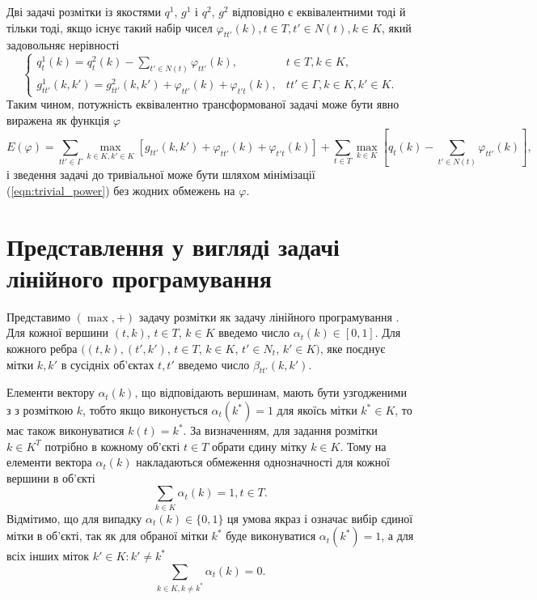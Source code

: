 Дві задачі розмітки із якостями $q^1$, $g^1$ і $q^2$, $g^2$ відповідно
є еквівалентними тоді й тільки тоді, якщо існує такий набір чисел 
$\varphi_{tt'}(k), t\in T, t'\in N(t), k\in K$, який задовольняє нерівності
\begin{equation}
    \begin{cases}
      q^1_t(k) = q^2_t(k) - \sum\limits_{t'\in N(t)} \varphi_{tt'}(k), & t\in T, k\in K,\\
      g^1_{tt'}(k,k') = g^2_{tt'}(k,k') + \varphi_{tt'}(k) + \varphi_{t't}(k), & 
        tt'\in\Gamma, k\in K, k'\in K.
    \end{cases}
  \end{equation}
Таким чином, потужність еквівалентно трансформованої задачі може бути 
явно виражена як функція $\varphi$
\begin{equation}
    \label{eqn:trivial_power}
    E(\varphi) = \sum\limits_{tt'\in\Gamma}\max\limits_{k\in K, k'\in K}[ g_{tt'}(k,k')
    + \varphi_{tt'}(k) + \varphi_{t't}(k)] + 
    \sum\limits_{t\in T}\max\limits_{k\in K}[ q_t(k) - \sum\limits_{t'\in N(t)} \varphi_{tt'}(k)],
   \end{equation}
і зведення задачі до тривіальної може бути шляхом мінімізації (\ref{eqn:trivial_power})
без жодних обмежень на $\varphi$.

\section{Представлення у вигляді задачі лінійного програмування}

Представимо $(\max,+)$ задачу розмітки як задачу 
лінійного програмування \cite{Werner:2010, savchynskyy}. Для кожної
вершини $(t,k)$, $t\in T$, $k\in K$ введемо число $\alpha_t(k)\in [0,1]$.
Для кожного ребра $((t,k),(t',k')$, $t\in T$, $k\in K$, $t'\in N_t$, $k'\in K)$, яке поєднує мітки
$k,k'$ в сусідніх об'єктах $t,t'$ введемо число $\beta_{tt'}(k,k')$. 

Елементи вектору $\alpha_t(k)$, що відповідають вершинам, мають бути узгодженими з 
з розміткою $k$, тобто якщо виконується $\alpha_t(k^*)=1$ для якоїсь мітки
$k^*\in K$, то має також виконуватися $k(t)=k^*$. За визначенням, для задання розмітки
$k\in K^T$ потрібно в кожному об'єкті $t\in T$ обрати єдину мітку $k\in K$.
Тому на елементи вектора $\alpha_t(k)$ накладаються обмеження однозначності для
кожної вершини в об'єкті
\begin{equation}
   \sum\limits_{k \in K} \alpha_t(k)=1,  t\in T.
 \end{equation}
Відмітимо, що для випадку $\alpha_t(k)\in \{0,1\}$ ця умова якраз і означає
вибір єдиної мітки в об'єкті, так як для обраної мітки $k^*$ буде виконуватися
$\alpha_t(k^*)=1$, а для всіх інших міток $k'\in K:k'\neq k^*$ 
\begin{equation}
  \sum\limits_{k \in K, k\neq k^*} \alpha_t(k)=0.
\end{equation}

